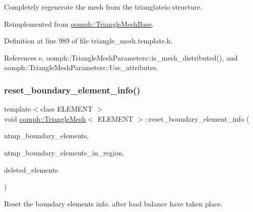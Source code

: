 Completely regenerate the mesh from the trianglateio structure. 



Reimplemented from \hyperlink{classoomph_1_1TriangleMeshBase_a2e7f54673e522b9be0543f0256afd04b}{oomph\+::\+Triangle\+Mesh\+Base}.



Definition at line 989 of file triangle\+\_\+mesh.\+template.\+h.



References e, oomph\+::\+Triangle\+Mesh\+Parameters\+::is\+\_\+mesh\+\_\+distributed(), and oomph\+::\+Triangle\+Mesh\+Parameters\+::\+Use\+\_\+attributes.

\mbox{\label{classoomph_1_1TriangleMesh_a2ae8220e71309b0fb2b53194c6383f95}} 
\subsubsection{\texorpdfstring{reset\+\_\+boundary\+\_\+element\+\_\+info()}{reset\_boundary\_element\_info()}}
{\footnotesize\ttfamily template$<$class E\+L\+E\+M\+E\+NT $>$ \\
void \hyperlink{classoomph_1_1TriangleMesh}{oomph\+::\+Triangle\+Mesh}$<$ E\+L\+E\+M\+E\+NT $>$\+::reset\+\_\+boundary\+\_\+element\+\_\+info (\begin{DoxyParamCaption}\item[{\hyperlink{classoomph_1_1Vector}{Vector}$<$ unsigned $>$ \&}]{ntmp\+\_\+boundary\+\_\+elements,  }\item[{\hyperlink{classoomph_1_1Vector}{Vector}$<$ \hyperlink{classoomph_1_1Vector}{Vector}$<$ unsigned $>$ $>$ \&}]{ntmp\+\_\+boundary\+\_\+elements\+\_\+in\+\_\+region,  }\item[{\hyperlink{classoomph_1_1Vector}{Vector}$<$ \hyperlink{classoomph_1_1FiniteElement}{Finite\+Element} $\ast$$>$ \&}]{deleted\+\_\+elements }\end{DoxyParamCaption})\hspace{0.3cm}{\ttfamily [virtual]}}



Reset the boundary elements info. after load balance have taken place. 

